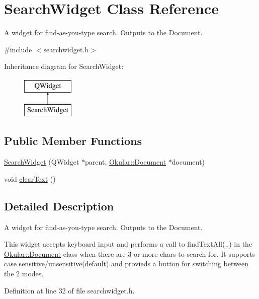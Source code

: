 \hypertarget{classSearchWidget}{\section{Search\+Widget Class Reference}
\label{classSearchWidget}
}


A widget for find-\/as-\/you-\/type search. Outputs to the Document.  




{\ttfamily \#include $<$searchwidget.\+h$>$}

Inheritance diagram for Search\+Widget\+:\begin{figure}[H]
\begin{center}
\leavevmode
\includegraphics[height=2.000000cm]{classSearchWidget}
\end{center}
\end{figure}
\subsection*{Public Member Functions}
\begin{DoxyCompactItemize}
\item 
\hyperlink{classSearchWidget_ade0fd26e061e90a11eb5de82f89694fb}{Search\+Widget} (Q\+Widget $\ast$parent, \hyperlink{classOkular_1_1Document}{Okular\+::\+Document} $\ast$document)
\item 
void \hyperlink{classSearchWidget_adb07419efdea44a0571bcb2eac153e77}{clear\+Text} ()
\end{DoxyCompactItemize}


\subsection{Detailed Description}
A widget for find-\/as-\/you-\/type search. Outputs to the Document. 

This widget accepts keyboard input and performs a call to find\+Text\+All(..) in the \hyperlink{classOkular_1_1Document}{Okular\+::\+Document} class when there are 3 or more chars to search for. It supports case sensitive/unsensitive(default) and provieds a button for switching between the 2 modes. 

Definition at line 32 of file searchwidget.\+h.



